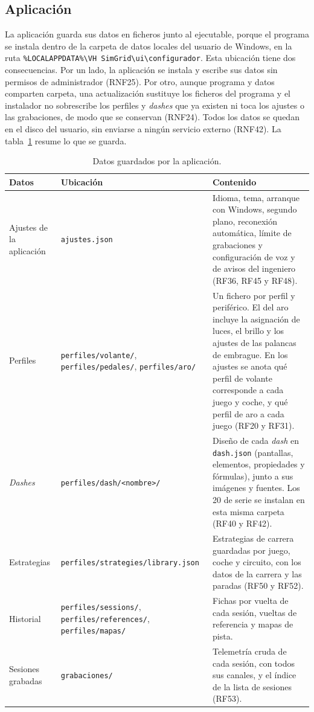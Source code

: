\subsection{Aplicación}
\label{subsec:persistencia-aplicacion}
La aplicación guarda sus datos en ficheros junto al ejecutable, porque el programa se instala dentro de la carpeta de datos locales del usuario de Windows, en la ruta \texttt{\%LOCALAPPDATA\%\textbackslash\allowbreak{}VH~SimGrid\textbackslash\allowbreak{}ui\textbackslash\allowbreak{}configurador}. Esta ubicación tiene dos consecuencias. Por un lado, la aplicación se instala y escribe sus datos sin permisos de administrador (RNF25). Por otro, aunque programa y datos comparten carpeta, una actualización sustituye los ficheros del programa y el instalador no sobrescribe los perfiles y \textit{dashes} que ya existen ni toca los ajustes o las grabaciones, de modo que se conservan (RNF24). Todos los datos se quedan en el disco del usuario, sin enviarse a ningún servicio externo (RNF42). La tabla~\ref{tab:persistencia-aplicacion} resume lo que se guarda.

\begin{table}[H]
	\centering
	\caption{Datos guardados por la aplicación.}
	\label{tab:persistencia-aplicacion}
	\small
	\begin{tabularx}{\textwidth}{@{}>{\raggedright\arraybackslash}p{2.1cm}>{\raggedright\arraybackslash}p{4.4cm}X@{}}
		\toprule
		\textbf{Datos} & \textbf{Ubicación} & \textbf{Contenido} \\
		\midrule
		Ajustes de la aplicación & \texttt{ajustes.json} & Idioma, tema, arranque con Windows, segundo plano, reconexión automática, límite de grabaciones y configuración de voz y de avisos del ingeniero (RF36, RF45 y RF48). \\
		Perfiles & \texttt{perfiles/volante/}, \texttt{perfiles/pedales/}, \texttt{perfiles/aro/} & Un fichero por perfil y periférico. El del aro incluye la asignación de luces, el brillo y los ajustes de las palancas de embrague. En los ajustes se anota qué perfil de volante corresponde a cada juego y coche, y qué perfil de aro a cada juego (RF20 y RF31). \\
		\textit{Dashes} & \texttt{perfiles/dash/\allowbreak{}<nombre>/} & Diseño de cada \textit{dash} en \texttt{dash.json} (pantallas, elementos, propiedades y fórmulas), junto a sus imágenes y fuentes. Los 20 de serie se instalan en esta misma carpeta (RF40 y RF42). \\
		Estrategias & \texttt{perfiles/\allowbreak{}strategies/\allowbreak{}library.json} & Estrategias de carrera guardadas por juego, coche y circuito, con los datos de la carrera y las paradas (RF50 y RF52). \\
		Historial & \texttt{perfiles/sessions/}, \texttt{perfiles/references/}, \texttt{perfiles/mapas/} & Fichas por vuelta de cada sesión, vueltas de referencia y mapas de pista. \\
		Sesiones grabadas & \texttt{grabaciones/} & Telemetría cruda de cada sesión, con todos sus canales, y el índice de la lista de sesiones (RF53). \\
		\bottomrule
	\end{tabularx}
\end{table}

